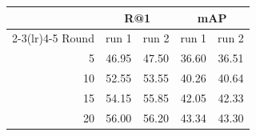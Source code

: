 \begin{tabular}{r cc cc}
\toprule
 & \multicolumn{2}{c}{R@1} & \multicolumn{2}{c}{mAP}\\
\cmidrule(lr){2-3}\cmidrule(lr){4-5}
Round & run 1 & run 2 & run 1 & run 2\\
\midrule
5 & 46.95 & 47.50 & 36.60 & 36.51\\
10 & 52.55 & 53.55 & 40.26 & 40.64\\
15 & 54.15 & 55.85 & 42.05 & 42.33\\
20 & 56.00 & 56.20 & 43.34 & 43.30\\
\bottomrule
\end{tabular}
